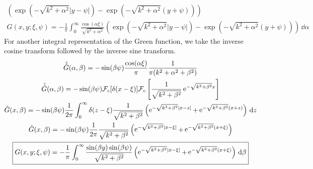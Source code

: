 {\begin{Solution}
\begin{gather*}
    \left( \exp\left( - \sqrt{k^2 + \alpha^2} |y-\psi| \right)
      - \exp\left( - \sqrt{k^2 + \alpha^2} (y+\psi) \right) \right) 
    \\
    \boxed{
      G(x,y;\xi,\psi) = - \frac{1}{\pi} \int_0^\infty 
      \frac{ \cos(\alpha \xi) }{ \sqrt{k^2 + \alpha^2} }
      \left( \exp\left( - \sqrt{k^2 + \alpha^2} |y-\psi| \right)
        - \exp\left( - \sqrt{k^2 + \alpha^2} (y+\psi) \right) \right) \,\dd \alpha
      }
  \end{gather*}
  For another integral representation of the Green function, we take the 
  inverse cosine transform followed by the inverse sine transform.
  \begin{gather*}
    \hat{\hat{G}}(\alpha,\beta) = - \sin(\beta\psi) \frac{\cos(\alpha\xi)}{\pi}
    \frac{1}{ \pi (k^2 + \alpha^2 + \beta^2) } \\
    \hat{\hat{G}}(\alpha,\beta) = - \sin(\beta\psi) 
    \mathcal{F}_c[ \delta(x-\xi) ]
    \mathcal{F}_c \left[ \frac{1}{\sqrt{k^2 + \beta^2}}
      \mathop{\mathrm{e}}\nolimits^{-\sqrt{ k^2 + \beta^2 } x} \right] \\
    \hat{G}(x,\beta) = - \sin(\beta\psi) \frac{1}{2\pi} \int_0^\infty \delta(z - \xi)
    \frac{1}{\sqrt{ k^2 + \beta^2 } } \left(
      \mathop{\mathrm{e}}\nolimits^{- \sqrt{k^2 + \beta^2} |x - z|} 
      + \mathop{\mathrm{e}}\nolimits^{- \sqrt{k^2 + \beta^2} (x + z)} \right) \,\mathrm{d} z \\
    \hat{G}(x,\beta) = - \sin(\beta\psi) \frac{1}{2\pi} 
    \frac{1}{\sqrt{ k^2 + \beta^2 } } \left(
      \mathop{\mathrm{e}}\nolimits^{- \sqrt{k^2 + \beta^2} |x - \xi|} 
      + \mathop{\mathrm{e}}\nolimits^{- \sqrt{k^2 + \beta^2} (x + \xi)} \right) \\
    \boxed{
      G(x,y;\xi,\psi) = - \frac{1}{\pi} \int_0^\infty
      \frac{\sin(\beta y) \sin(\beta \psi)}{\sqrt{ k^2 + \beta^2 } } \left(
        \mathop{\mathrm{e}}\nolimits^{- \sqrt{k^2 + \beta^2} |x - \xi|} 
        + \mathop{\mathrm{e}}\nolimits^{- \sqrt{k^2 + \beta^2} (x + \xi)} \right)\,\mathrm{d} \beta
      }
  \end{gather*}
\end{Solution}






}
